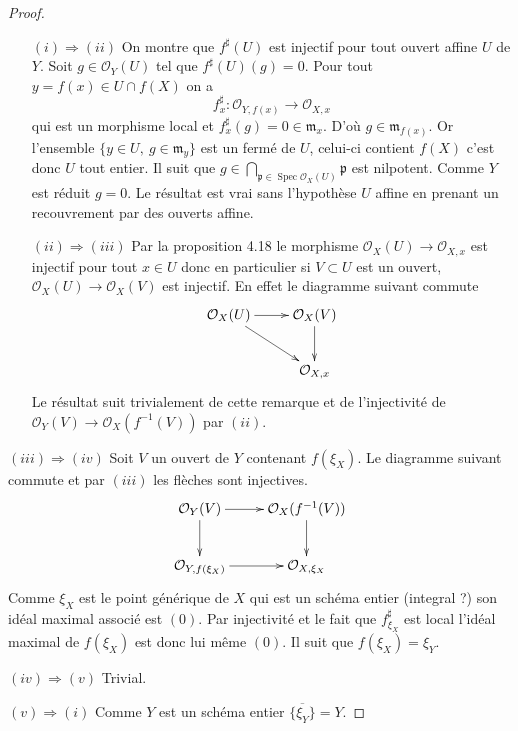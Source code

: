 \documentclass[A4, 11pt]{article}
\def\Spec{ \operatorname{Spec}}
\begin{document}
\begin{proof}
\begin{itemize}

\item[$(i)\Rightarrow (ii)$] On montre que $f^{\sharp}(U)$ est injectif pour tout ouvert affine $U$ de $Y$. Soit $g\in \mathcal{O}_Y(U)$ tel que $f^{\sharp}(U)(g)=0$. Pour tout $y=f(x)\in U\cap f(X)$ on a 
$$f^{\sharp}_x\colon \mathcal{O}_{Y,f(x)} \rightarrow \mathcal{O}_{X,x}$$
qui est un morphisme local et $f^{\sharp}_x(g)=0\in \mathfrak{m}_x$. D'où $g\in \mathfrak{m}_{f(x)}$. Or l'ensemble $\{y\in U, ~g\in \mathfrak{m}_y\}$ est un fermé de $U$, celui-ci contient $f(X)$ c'est donc $U$ tout entier. Il suit que $g\in \bigcap\limits_{\mathfrak{p}\in \Spec \mathcal{O}_X(U)} \mathfrak{p}$ est nilpotent. Comme $Y$ est réduit $g=0$. Le résultat est vrai sans l'hypothèse $U$ affine en prenant un recouvrement par des ouverts affine.
\item[$(ii)\Rightarrow (iii)$] Par la proposition 4.18 le morphisme $\mathcal{O}_X(U)\rightarrow \mathcal{O}_{X,x}$ est injectif pour tout $x\in U$ donc en particulier si $V\subset U$ est un ouvert, $\mathcal{O}_X(U)\rightarrow \mathcal{O}_X(V)$ est injectif. En effet le diagramme suivant commute
$$\xymatrix{
\mathcal{O}_X(U) \ar[r] \ar[dr] & \mathcal{O}_X(V) \ar[d] \\
 & \mathcal{O}_{X,x} 
}$$ 
Le résultat suit trivialement de cette remarque et de l'injectivité de $\mathcal{O}_Y(V) \rightarrow \mathcal{O}_X(f^{-1}(V))$ par $(ii)$.
\end{itemize}

\item[$(iii)\Rightarrow (iv)$] Soit $V$ un ouvert de $Y$ contenant $f(\xi_X )$. Le diagramme suivant commute et par $(iii)$ les flèches sont injectives.
$$\xymatrix{
\mathcal{O}_Y(V) \ar[r] \ar[d] & \mathcal{O}_X(f^{-1}(V)) \ar[d]\\
\mathcal{O}_{Y,f(\xi_X)} \ar[r] & \mathcal{O}_{X,\xi_X} 
}$$
Comme $\xi_X$ est le point générique de $X$ qui est un schéma entier (integral ?) son idéal maximal associé est $(0)$. Par injectivité et le fait que $f^{\sharp}_{\xi_X}$ est local l'idéal maximal de $f(\xi_X)$ est donc lui même $(0)$. Il suit que $f(\xi_X)=\xi_Y$.

\item[$(iv)\Rightarrow (v)$] Trivial.
\item[$(v)\Rightarrow (i)$] Comme $Y$ est un schéma entier $\overline{\{\xi_Y\}}=Y$.
 
\end{proof}
\end{document}
